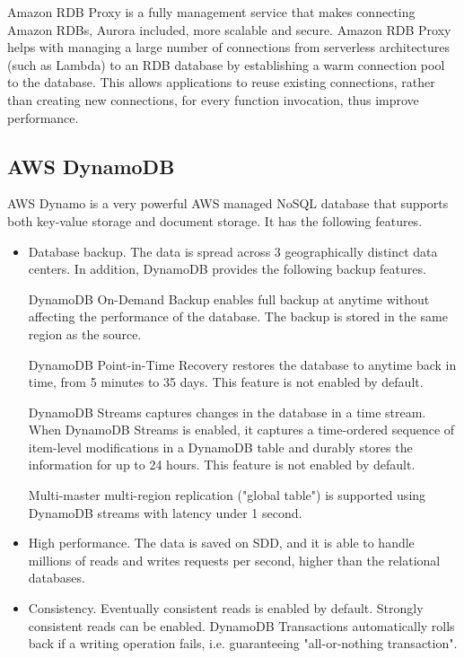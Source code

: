 Amazon RDB Proxy is a fully management service that makes connecting Amazon RDBs, Aurora included, more scalable and secure. Amazon RDB Proxy helps with managing a large number of connections from serverless architectures (such as Lambda) to an RDB database by establishing a warm connection pool to the database. This allows applications to reuse existing connections, rather than creating new connections, for every function invocation, thus improve performance.

\subsection{AWS DynamoDB}

AWS Dynamo is a very powerful AWS managed NoSQL database that supports both key-value storage and document storage. It has the following features.
\begin{itemize}
	\item Database backup. The data is spread across 3 geographically distinct data centers. In addition, DynamoDB provides the following backup features.
	
	DynamoDB On-Demand Backup enables full backup at anytime without affecting the performance of the database. The backup is stored in the same region as the source. 
	
	DynamoDB Point-in-Time Recovery restores the database to anytime back in time, from 5 minutes to 35 days. This feature is not enabled by default. 
	
	DynamoDB Streams captures changes in the database in a time stream. When DynamoDB Streams is enabled, it captures a time-ordered sequence of item-level modifications in a DynamoDB table and durably stores the information for up to 24 hours. This feature is not enabled by default.
	
	Multi-master multi-region replication ("global table") is supported using DynamoDB streams with latency under 1 second.
	
	\item High performance. The data is saved on SDD, and it is able to handle millions of reads and writes requests per second, higher than the relational databases.
	
	\item Consistency. Eventually consistent reads is enabled by default. Strongly consistent reads can be enabled. DynamoDB Transactions automatically rolls back if a writing operation fails, i.e. guaranteeing "all-or-nothing transaction".
	
\end{itemize}

